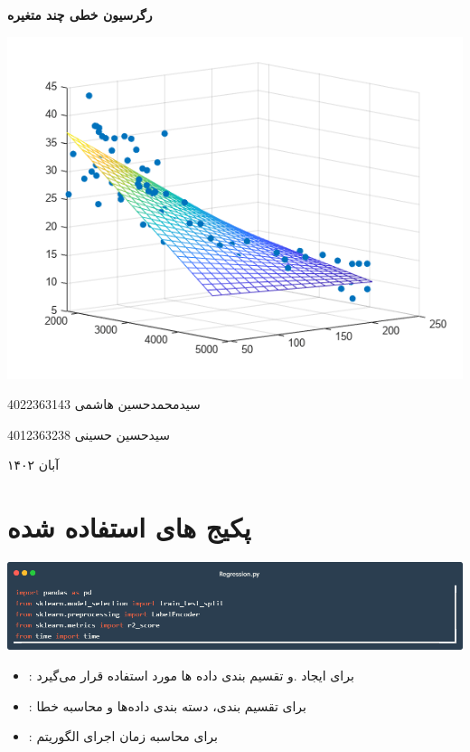 \documentclass[12pt, dvipsnames, svgnames, x11names,]{article}
\begin{document}
	\begin{titlepage}
		\centering
		\vspace{1cm}
		{\Huge {\textbf{رگرسیون خطی چند متغیره}}\par}
		\vspace{15mm}
		\vspace{16mm}
		\includegraphics[width=14cm]{images/EstimateMultipleLinearRegression} \par
		\vfill \par	\vfill
		\vspace{16mm}
		{\normalsize	سیدمحمدحسین هاشمی  4022363143 \par}
		
		{\normalsize	سیدحسین حسینی  4012363238 \par}
		\vspace{1cm}
		{\large آبان ۱۴۰۲\par}
	\end{titlepage}
	\tableofcontents
	\newpage
	
	
	\section{پکیج های استفاده شده}
	
		{\includegraphics[width=14cm]{images/libraries}}
	
		\begin{itemize}
			\item 
			{\Large {}:}
			{\small برای ایجاد  .و تقسیم بندی داده ها مورد استفاده قرار می‌گیرد}
		
				
			\item 
			{\Large {}:}
			{\small برای تقسیم بندی، دسته بندی داده‌ها و محاسبه خطا }
		
			\item 
			{\Large {}:}
			{\small برای محاسبه زمان اجرای الگوریتم}
		
		\end{itemize}
	
\end{document}
